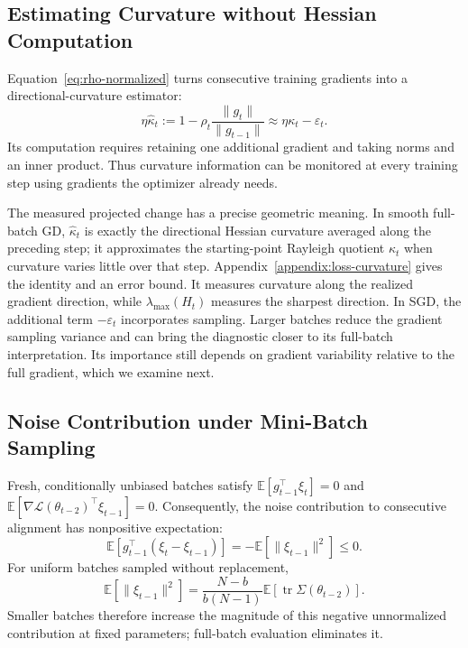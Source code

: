 \subsection{Estimating Curvature without Hessian Computation}
\label{subsec:curvature-diagnostic}

Equation~\eqref{eq:rho-normalized} turns consecutive training gradients
into a directional-curvature estimator:
\begin{equation}
  \eta\widehat\kappa_t
  :=1-\rho_t\frac{\|g_t\|}{\|g_{t-1}\|}
   \approx\eta\kappa_t-\varepsilon_t.
\label{eq:kappa-estimate}
\end{equation}
Its computation requires retaining one additional gradient and taking
norms and an inner product. Thus curvature information can be monitored at every
training step using gradients the optimizer already needs.

The measured projected change has a precise geometric meaning. In smooth
full-batch GD, $\widehat\kappa_t$ is exactly the directional Hessian
curvature averaged along the preceding step; it approximates the
starting-point Rayleigh quotient $\kappa_t$ when curvature varies little
over that step. Appendix~\ref{appendix:loss-curvature} gives the identity
and an error bound. It measures curvature along the realized gradient
direction, while $\lambda_{\max}(H_t)$ measures the sharpest direction.
In SGD, the additional term $-\varepsilon_t$ incorporates sampling.
Larger batches reduce the gradient sampling variance and can
bring the diagnostic closer to its full-batch interpretation. Its
importance still depends on gradient variability relative to the full
gradient, which we examine next.

\subsection{Noise Contribution under Mini-Batch Sampling}
\label{subsec:sampling-noise}

Fresh, conditionally unbiased batches satisfy
$\mathbb E[g_{t-1}^\top\xi_t]=0$ and
$\mathbb E[\nabla\mathcal L(\theta_{t-2})^\top\xi_{t-1}]=0$.
Consequently, the noise contribution to consecutive alignment has
nonpositive expectation:
\begin{equation}
  \mathbb E[g_{t-1}^\top(\xi_t-\xi_{t-1})]
  =-\mathbb E[\|\xi_{t-1}\|^2]\leq0.
  \label{eq:noise-expectation}
\end{equation}
For uniform batches sampled without replacement,
\begin{equation}
  \mathbb E[\|\xi_{t-1}\|^2]
  =\frac{N-b}{b(N-1)}
    \mathbb E[\operatorname{tr}\Sigma(\theta_{t-2})].
  \label{eq:finite-population-noise}
\end{equation}
Smaller batches therefore increase the magnitude of this negative
unnormalized contribution at fixed parameters; full-batch evaluation
eliminates it.

